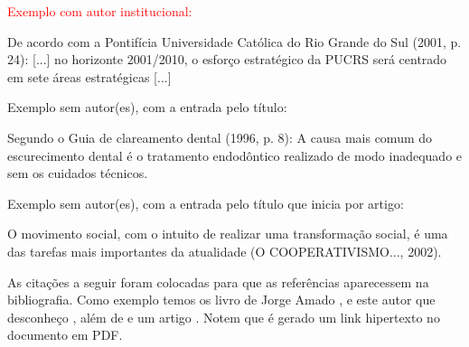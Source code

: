 \bigskip

{\sffamily
\textrm{\textcolor{red}{Exemplo com autor institucional: }}}

\bigskip

De acordo com a Pontifícia Universidade Católica do Rio Grande do Sul (2001, p. 24): {\textquotedbl}[...] no horizonte 2001/2010, o esforço estratégico da PUCRS será centrado em sete áreas estratégicas [...]{\textquotedbl}\\

\bigskip

{\color{red}
Exemplo sem autor(es), com a entrada pelo título:}

\bigskip

Segundo o Guia de clareamento dental (1996, p. 8): {\textquotedbl}A causa mais comum do escurecimento dental é o tratamento endodôntico realizado de modo inadequado e sem os cuidados técnicos.{\textquotedbl}\\

\bigskip

{\color{red}
Exemplo sem autor(es), com a entrada pelo título que inicia por artigo:}

\bigskip

O movimento social, com o intuito de realizar uma transformação social, é uma das tarefas mais importantes da atualidade
(O COOPERATIVISMO..., 2002).\\

\bigskip

As citações a seguir foram colocadas para que as referências aparecessem na bibliografia. Como exemplo temos os livro de Jorge Amado \cite{book:AMADO}  \cite{book:AMADO2}, e este autor que desconheço \cite{book:OHANSSON}, além de \cite{book:ENGEL} e um artigo \cite{art:PRADO}. Notem que é gerado um link hipertexto no documento em PDF.
